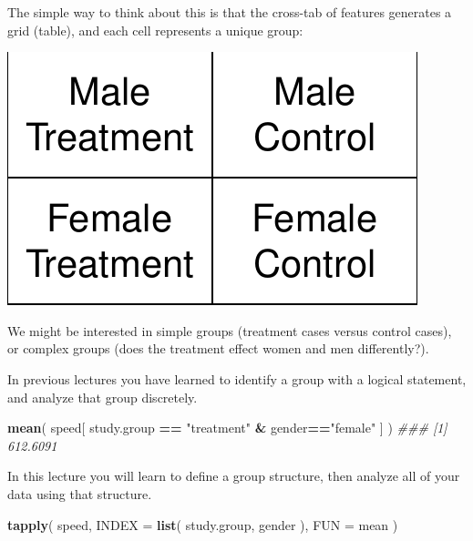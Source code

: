 \documentclass[]{book}
\newenvironment{Shaded}{\begin{snugshade}}{\end{snugshade}}
\newcommand{\CommentTok}[1]{\textcolor[rgb]{0.56,0.35,0.01}{\textit{#1}}}
\newcommand{\DataTypeTok}[1]{\textcolor[rgb]{0.13,0.29,0.53}{#1}}
\newcommand{\KeywordTok}[1]{\textcolor[rgb]{0.13,0.29,0.53}{\textbf{#1}}}
\newcommand{\NormalTok}[1]{#1}
\newcommand{\OperatorTok}[1]{\textcolor[rgb]{0.81,0.36,0.00}{\textbf{#1}}}
\newcommand{\StringTok}[1]{\textcolor[rgb]{0.31,0.60,0.02}{#1}}
\theoremstyle{definition}
\theoremstyle{definition}
\theoremstyle{definition}
\theoremstyle{remark}
\begin{document}
The simple way to think about this is that the cross-tab of features
generates a grid (table), and each cell represents a unique group:

\begin{center}\includegraphics[width=0.7\linewidth]{DS4PS-I_files/figure-latex/unnamed-chunk-138-1} \end{center}

We might be interested in simple groups (treatment cases versus control
cases), or complex groups (does the treatment effect women and men
differently?).

In previous lectures you have learned to identify a group with a logical
statement, and analyze that group discretely.

\begin{Shaded}
\begin{Highlighting}[]

\KeywordTok{mean}\NormalTok{( speed[ study.group }\OperatorTok{==}\StringTok{ "treatment"} \OperatorTok{&}\StringTok{ }\NormalTok{gender}\OperatorTok{==}\StringTok{"female"}\NormalTok{ ] )}
\CommentTok{### [1] 612.6091}
\end{Highlighting}
\end{Shaded}

In this lecture you will learn to define a group structure, then analyze
all of your data using that structure.

\begin{Shaded}
\begin{Highlighting}[]

\KeywordTok{tapply}\NormalTok{( speed, }\DataTypeTok{INDEX =} \KeywordTok{list}\NormalTok{( study.group, gender ), }\DataTypeTok{FUN =}\NormalTok{ mean )}
\end{Highlighting}
\end{Shaded}
\end{document}
